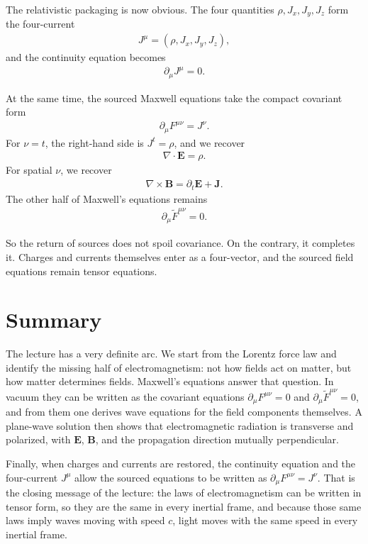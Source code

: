 The relativistic packaging is now obvious. The four quantities \(\rho, J_x, J_y, J_z\) form the four-current
\begin{align}
J^\mu = (\rho, J_x, J_y, J_z),
\end{align}
and the continuity equation becomes
\begin{align}
\partial_\mu J^\mu = 0.
\end{align}

At the same time, the sourced Maxwell equations take the compact covariant form
\begin{align}
\partial_\mu F^{\mu\nu} = J^\nu.
\end{align}
For \(\nu=t\), the right-hand side is \(J^t=\rho\), and we recover
\begin{align}
\nabla \cdot \mathbf E = \rho.
\end{align}
For spatial \(\nu\), we recover
\begin{align}
\nabla \times \mathbf B = \partial_t \mathbf E + \mathbf J.
\end{align}
The other half of Maxwell's equations remains
\begin{align}
\partial_\mu \tilde F^{\mu\nu} = 0.
\end{align}

So the return of sources does not spoil covariance. On the contrary, it completes it. Charges and currents themselves enter as a four-vector, and the sourced field equations remain tensor equations.

\section{Summary}

The lecture has a very definite arc. We start from the Lorentz force law and identify the missing half of electromagnetism: not how fields act on matter, but how matter determines fields. Maxwell's equations answer that question. In vacuum they can be written as the covariant equations \(\partial_\mu F^{\mu\nu}=0\) and \(\partial_\mu \tilde F^{\mu\nu}=0\), and from them one derives wave equations for the field components themselves. A plane-wave solution then shows that electromagnetic radiation is transverse and polarized, with \(\mathbf E\), \(\mathbf B\), and the propagation direction mutually perpendicular.

Finally, when charges and currents are restored, the continuity equation and the four-current \(J^\mu\) allow the sourced equations to be written as \(\partial_\mu F^{\mu\nu}=J^\nu\). That is the closing message of the lecture: the laws of electromagnetism can be written in tensor form, so they are the same in every inertial frame, and because those same laws imply waves moving with speed \(c\), light moves with the same speed in every inertial frame.